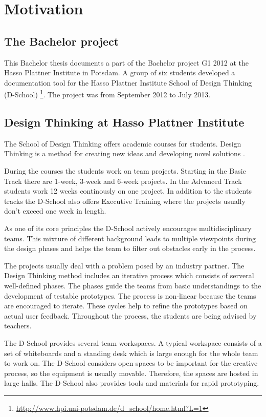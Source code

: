 \chapter{Motivation}

\section{The Bachelor project}
This Bachelor thesis documents a part of the Bachelor project G1 2012 at the Hasso Plattner Institute in Potsdam. A group of six students developed a documentation tool for the Hasso Plattner Institute School of Design Thinking (D-School) \footnote{\url{http://www.hpi.uni-potsdam.de/d_school/home.html?L=1}}. The project was from September 2012 to July 2013. 


\section{Design Thinking at Hasso Plattner Institute}
The School of Design Thinking offers academic courses for students. Design Thinking is a method for creating new ideas and  developing novel solutions \cite{Plattner_2009}. 

During the courses the students work on team projects. Starting in the Basic Track there are 1-week, 3-week and 6-week projects. In the Advanced Track students work 12 weeks continously on one project. In addition to the students tracks the D-School also offers Executive Training where the projects usually don't exceed one week in length. 

As one of its core principles the D-School actively encourages multidisciplinary teams. This mixture of different background leads to multiple viewpoints during the design phases and helps the team to filter out obstacles early in the process. 

The projects usually deal with a problem posed by an industry partner. The Design Thinking method includes an iterative process which consists of serveral well-defined phases. The phases guide the teams from basic understandings to the development of testable prototypes. The process is non-linear because the teams are encouraged to iterate. These cycles help to refine the prototypes based on actual user feedback. Throughout the process, the students are being advised by teachers. 

The D-School provides several team workspaces. A typical workspace consists of a set of whiteboards and a standing desk which is large enough for the whole team to work on. The D-School considers open spaces to be important for the creative process, so the equipment is usually movable. Therefore, the spaces are hosted in large halls. The D-School also provides tools and materials for rapid prototyping.

